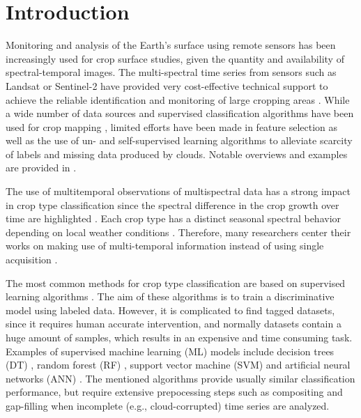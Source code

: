 \documentclass[journal,article,submit,pdftex,moreauthors]{Definitions/mdpi}
\begin{document}

\section{Introduction}
Monitoring and analysis of the Earth's surface using remote sensors has been increasingly used for crop surface studies, 
given the quantity and availability of spectral-temporal images. 
The multi-spectral time series from sensors such as Landsat or Sentinel-2 have provided very cost-effective technical support to achieve the reliable identification and monitoring of large cropping areas \cite{Vuolo2018, Pelletier2019, Foerster2012, Chen2022}. 
While a wide number of data sources and 
supervised classification algorithms have been used for crop mapping \cite{Hu2016,Palchowdhuri2018,Heupel2018,Li2023,Dong2020,Paris2020,Russwurm2020,Foerster2012,Chen2022}, limited efforts have been made in feature selection as well as the use of un- and self-supervised learning algorithms to alleviate scarcity of labels and missing data produced by clouds.
Notable overviews and examples are provided in \cite{Yin2020,Yi2020,He2022, Dumeur2024, Wang2019}.

The use of multitemporal observations of multispectral data has a strong impact in crop type classification since the spectral difference in the crop growth over time are highlighted \cite{Vuolo2018,Yi2020}.
Each crop type has a distinct seasonal spectral behavior depending on local weather conditions \cite{Foerster2012}. 
Therefore, many researchers center their works on making use of multi-temporal information instead of
using single acquisition \cite{Vuolo2018, Dong2020, Hu2016, Roy2020}.

The most common methods for crop type classification are based on supervised learning algorithms \cite{Feng2019,Kussul2017,Cai2018,ManishLad2022,Inglada2017}. 
The aim of these algorithms is to train a discriminative model using labeled data. However, it is complicated to find tagged datasets, 
since it requires human accurate intervention, and normally datasets contain a huge amount of samples, which results 
in an expensive and time consuming task. Examples of supervised machine learning (ML) models include
decision trees (DT) \cite{Rokach2005}, random forest (RF) \cite{Breiman2001}, support vector machine (SVM) \cite{cortes1995} and artificial neural networks (ANN) \cite{Rosenblatt1958}.
The mentioned algorithms provide usually similar classification performance, but require extensive prepocessing steps such as compositing and gap-filling when incomplete (e.g., cloud-corrupted) time series are analyzed.
\end{document}
